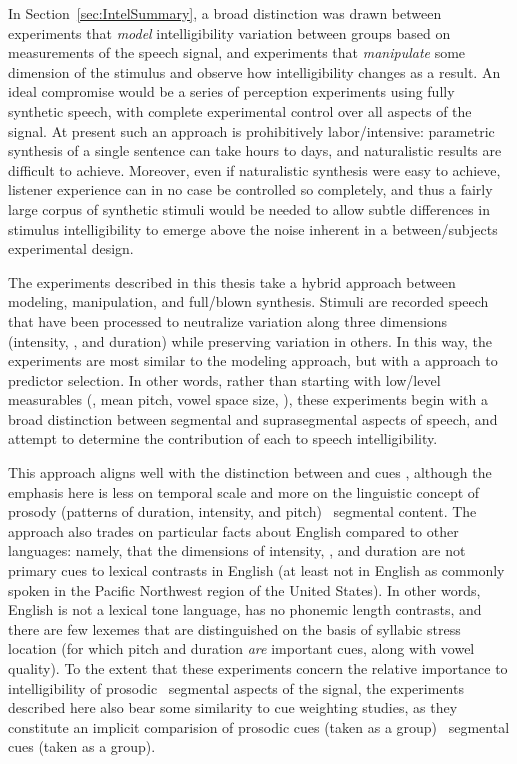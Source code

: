 
In Section~\ref{sec:IntelSummary}, a broad distinction was drawn between experiments that \emph{model} intelligibility variation between groups based on measurements of the speech signal, and experiments that \emph{manipulate} some dimension of the stimulus and observe how intelligibility changes as a result.  An ideal compromise would be a series of perception experiments using fully synthetic speech, with complete experimental control over all aspects of the signal.  At present such an approach is prohibitively labor\-/intensive: parametric synthesis of a single sentence can take hours to days, and naturalistic results are difficult to achieve.  Moreover, even if naturalistic synthesis were easy to achieve, listener experience can in no case be controlled so completely, and thus a fairly large corpus of synthetic stimuli would be needed to allow subtle differences in stimulus intelligibility to emerge above the noise inherent in a between\-/subjects experimental design.

The experiments described in this thesis take a hybrid approach between modeling, manipulation, and full\-/blown synthesis.  Stimuli are recorded speech that have been processed to neutralize variation along three dimensions (intensity, \fo, and duration) while preserving variation in others.  In this way, the experiments are most similar to the modeling approach, but with a  approach to predictor selection.  In other words, rather than starting with low\-/level measurables (\eg, mean pitch, vowel space size, \etc), these experiments begin with a broad distinction between segmental and suprasegmental aspects of speech, and attempt to determine the contribution of each to speech intelligibility.  

This approach aligns well with the distinction between  and  cues \citep{Rosen1992}, although the emphasis here is less on temporal scale and more on the linguistic concept of prosody (patterns of duration, intensity, and pitch) \vs\ segmental content.\footnotemark{}  The approach also trades on particular facts about English compared to other languages: namely, that the dimensions of intensity, \fo, and duration are not primary cues to lexical contrasts in English (at least not in English as commonly spoken in the Pacific Northwest region of the United States).  In other words, English is not a lexical tone language, has no phonemic length contrasts, and there are few lexemes that are distinguished on the basis of syllabic stress location (for which pitch and duration \emph{are} important cues, along with vowel quality).  To the extent that these experiments concern the relative importance to intelligibility of prosodic \vs\ segmental aspects of the signal, the experiments described here also bear some similarity to cue weighting studies, as they constitute an implicit comparision of prosodic cues (taken as a group) \vs\ segmental cues (taken as a group).

